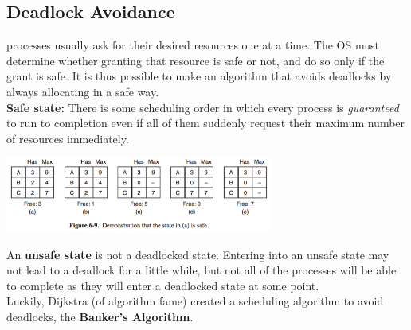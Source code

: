 \documentclass{article}
\begin{document}
\subsection*{Deadlock Avoidance}
processes usually ask for their desired resources one at a time. The OS must determine whether granting that resource is safe or not, and do so only if the grant is safe. It is thus possible to make an algorithm that avoids deadlocks by always allocating in a safe way.
\\\textbf{Safe state:} There is some scheduling order in which every process is \textit{guaranteed} to run to completion even if all of them suddenly request their maximum number of resources immediately.
\begin{center}
\includegraphics[width= 250pt]{tex/ch6/6-9.png}
\end{center}
An \textbf{unsafe state} is not a deadlocked state. Entering into an unsafe state may not lead to a deadlock for a little while, but not all of the processes will be able to complete as they will enter a deadlocked state at some point.
\\Luckily, Dijkstra (of algorithm fame) created a scheduling algorithm to avoid deadlocks, the \textbf{Banker's Algorithm}.
\end{document}
